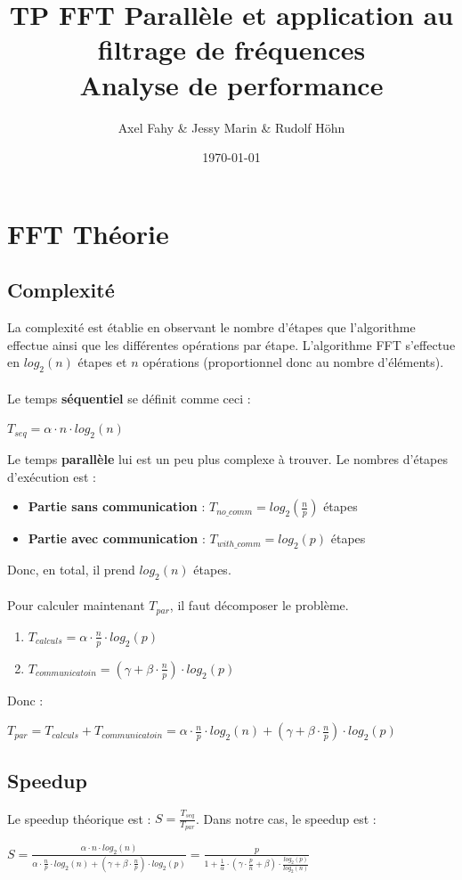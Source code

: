 \documentclass[a4paper]{article}
\title{TP FFT Parallèle et application au filtrage de fréquences\\Analyse de performance}
\author{Axel Fahy \& Jessy Marin \& Rudolf Höhn}
\date{\today}
\begin{document}
\maketitle

\section{FFT Théorie}

\subsection{Complexité}
La complexité est établie en observant le nombre d'étapes que l'algorithme effectue ainsi que les différentes opérations par étape. L'algorithme FFT s'effectue en $log_2(n)$ étapes
et $n$ opérations (proportionnel donc au nombre d'éléments).\\\\
Le temps \textbf{séquentiel} se définit comme ceci :
\begin{center}
$ T_{seq} = \alpha \cdot n \cdot log_2(n) $
\end{center}
Le temps \textbf{parallèle} lui est un peu plus complexe à trouver. Le nombres d'étapes d'exécution est :
\begin{itemize}
\item \textbf{Partie sans communication} : $ T_{no\_comm} = log_2(\frac{n}{p})$ étapes
\item \textbf{Partie avec communication} : $ T_{with\_comm} = log_2(p) $ étapes
\end{itemize}
Donc, en total, il prend $log_2(n)$ étapes.\\\\
Pour calculer maintenant $T_{par}$, il faut décomposer le problème.
\begin{enumerate}
\item $T_{calculs} = \alpha \cdot \frac{n}{p} \cdot log_2(p) $
\item $T_{communicatoin} = (\gamma + \beta \cdot \frac{n}{p}) \cdot log_2(p)$
\end{enumerate}
Donc :
\begin{center}
$T_{par} = T_{calculs} + T_{communicatoin} = \alpha \cdot \frac{n}{p} \cdot log_2(n) + (\gamma + \beta \cdot \frac{n}{p}) \cdot log_2(p)$
\end{center}

\subsection{Speedup}
Le speedup théorique est : $S = \frac{T_{seq}}{T_{par}}$. Dans notre cas, le speedup est :
\begin{center}
$S = \frac{\alpha \cdot n \cdot log_2(n)}{\alpha \cdot \frac{n}{p} \cdot log_2(n) + (\gamma + \beta \cdot \frac{n}{p}) \cdot log_2(p)} = \frac{p}{1 + \frac{1}{\alpha} \cdot ( \gamma \cdot \frac{p}{n} + \beta) \cdot \frac{log_2(p)}{log_2(n)}}$
\end{center}
\end{document}
